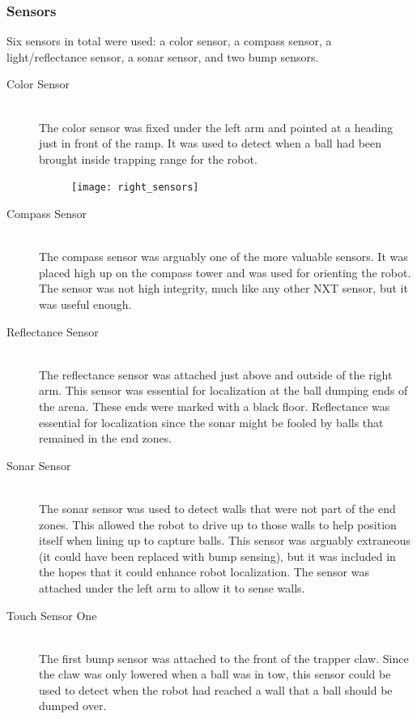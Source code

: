 \documentclass{article}
\begin{document}
\subsubsection{Sensors}
Six sensors in total were used: a color sensor, a compass sensor, a light/reflectance sensor, a sonar sensor, and two bump sensors.

\begin{description}
  \item[Color Sensor] \hfill \\
  The color sensor was fixed under the left arm and pointed at a heading just in front of the ramp. It was used to detect when a ball had been brought inside trapping range for the robot.

  \begin{figure}[h]
    \centering
    \texttt{[image: right\_sensors]}
    \caption{}
    \label{fig:color_and_light_sensors}
  \end{figure}

  \item[Compass Sensor] \hfill \\
  The compass sensor was arguably one of the more valuable sensors. It was placed high up on the compass tower and was used for orienting the robot. The sensor was not high integrity, much like any other NXT sensor, but it was useful enough.

  \item[Reflectance Sensor] \hfill \\
  The reflectance sensor was attached just above and outside of the right arm. This sensor was essential for localization at the ball dumping ends of the arena. These ends were marked with a black floor. Reflectance was essential for localization since the sonar might be fooled by balls that remained in the end zones.

  \item[Sonar Sensor] \hfill \\
  The sonar sensor was used to detect walls that were not part of the end zones. This allowed the robot to drive up to those walls to help position itself when lining up to capture balls. This sensor was arguably extraneous (it could have been replaced with bump sensing), but it was included in the hopes that it could enhance robot localization. The sensor was attached under the left arm to allow it to sense walls.

  \item[Touch Sensor One] \hfill \\
  The first bump sensor was attached to the front of the trapper claw. Since the claw was only lowered when a ball was in tow, this sensor could be used to detect when the robot had reached a wall that a ball should be dumped over.


\end{description}
\end{document}

